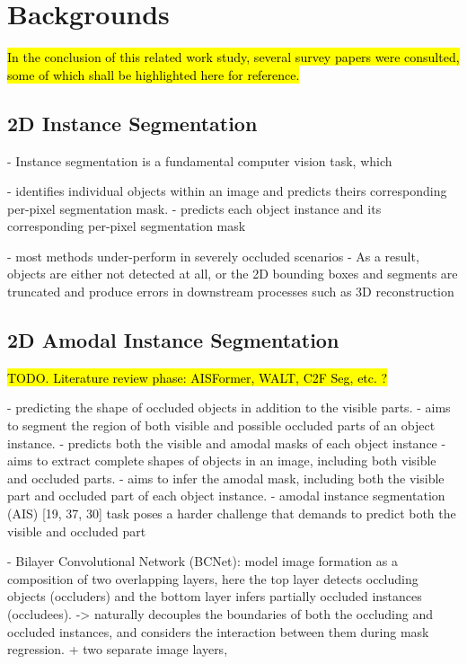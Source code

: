 \chapter{Backgrounds}%
\hl{
In the conclusion of this related work study, several survey papers were consulted, some of which shall be highlighted here for reference.}

\section{2D Instance Segmentation}
-  Instance segmentation is a fundamental computer vision task, which 

- identifies individual objects within an image and predicts theirs corresponding per-pixel segmentation mask.
- predicts each object instance and its corresponding per-pixel segmentation mask

- most methods under-perform in severely occluded scenarios
- As a result, objects are either not detected at all, or the 2D bounding boxes and segments are truncated and produce errors in downstream processes such as 3D reconstruction 


\section{2D Amodal Instance Segmentation}
\hl{TODO. Literature review phase: AISFormer, WALT, C2F Seg, etc. ?}

- predicting the shape of occluded objects in addition to the visible parts. 
- aims to segment the region of both visible and possible occluded parts of an object instance.
-  predicts both the visible and amodal masks of each object instance
- aims to extract complete shapes of objects in an image, including both visible and occluded parts.
- aims to infer the amodal mask, including both the visible part and occluded part of each object instance.
- amodal instance segmentation (AIS) [19, 37, 30] task poses a harder challenge that demands to predict both the visible and occluded part


- Bilayer Convolutional Network (BCNet): model image formation as a composition of two overlapping layers, here the top layer detects occluding objects (occluders) and the bottom layer infers partially occluded instances (occludees). -> naturally decouples the boundaries of both the occluding and occluded instances, and considers the interaction between them during mask regression.
+ two separate image layers,


